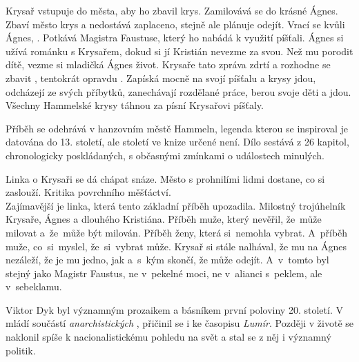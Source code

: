 \documentclass{extarticle} %
\begin{document}
\noindent Krysař vstupuje do města, aby ho zbavil krys.
Zamilovává se do krásné Ágnes.
Zbaví město krys a nedostává zaplaceno, stejně ale plánuje odejít.
Vrací se kvůli Ágnes, .
Potkává Magistra Faustuse, který ho nabádá k využití píšťali.
Ágnes si užívá románku s Krysařem, dokud si jí Kristián nevezme za svou.
Než mu porodit dítě, vezme si mladičká Ágnes život.
Krysaře tato zpráva zdrtí a rozhodne se zbavit , tentokrát opravdu .
Zapíská mocně na svojí píšťalu a krysy jdou, odcházejí ze svých příbytků, zanechávají rozdělané práce, berou svoje děti a jdou.
Všechny Hammelské krysy táhnou za písní Krysařovi píšťaly.

\noindent 
Příběh se odehrává v hanzovním městě Hammeln, legenda kterou se  inspiroval je datována do 13. století, ale století ve knize určené není.
Dílo sestává z 26 kapitol, chronologicky poskládaných, s občasnými zmínkami o událostech minulých.

\noindent 
Linka o Krysaři se dá chápat snáze.
Město s prohnilími lidmi dostane, co si zaslouží.
Kritika povrchního měšťáctví.\\
Zajímavější je linka, která tento základní příběh upozadila.
Milostný trojúhelník Krysaře, Ágnes a dlouhého Kristiána.
Příběh muže, který nevěřil, že~může milovat a~že~může být milován.
Příběh ženy, která si~nemohla vybrat.
A~příběh muže, co~si~myslel, že~si~vybrat může.
Krysař si stále nalhával, že mu na Ágnes nezáleží, že je mu jedno, jak a~s~kým skončí, že může odejít.
A~v~tomto byl stejný jako Magistr Faustus, ne v~pekelné moci, ne v~alianci s~peklem, ale v~sebeklamu.






\noindent Viktor Dyk byl významným prozaikem a básníkem první poloviny 20. století.
V mládí součástí \textit{anarchistických }, přičinil se i ke časopisu \textit{Lumír}.
Později v životě se naklonil spíše k nacionalistickému pohledu na svět a stal se z něj i významný politik.

\end{document}
